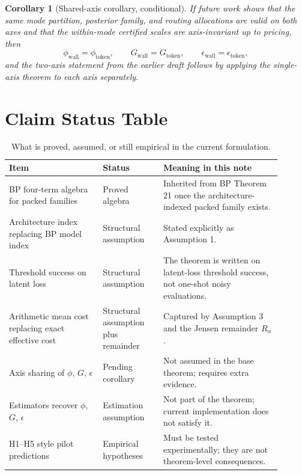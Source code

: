 \documentclass[11pt]{article}
\newtheorem{corollary}{Corollary}
\begin{document}
\begin{corollary}[Shared-axis corollary, conditional]
If future work shows that the same mode partition, posterior family, and routing allocations are
valid on both axes and that the within-mode certified scales are axis-invariant up to pricing, then
\[
\phi_{\mathrm{wall}}=\phi_{\mathrm{token}},\qquad
G_{\mathrm{wall}}=G_{\mathrm{token}},\qquad
\epsilon_{\mathrm{wall}}=\epsilon_{\mathrm{token}},
\]
and the two-axis statement from the earlier draft follows by applying the single-axis theorem to
each axis separately.
\end{corollary}

\section{Claim Status Table}

\begin{table}[h]
\centering
\begin{tabular}{p{0.31\linewidth} p{0.2\linewidth} p{0.39\linewidth}}
\toprule
Item & Status & Meaning in this note \\
\midrule
BP four-term algebra for packed families & Proved algebra & Inherited from BP Theorem 21 once the architecture-indexed packed family exists. \\
\addlinespace
Architecture index replacing BP model index & Structural assumption & Stated explicitly as Assumption 1. \\
\addlinespace
Threshold success on latent loss & Structural assumption & The theorem is written on latent-loss threshold success, not one-shot noisy evaluations. \\
\addlinespace
Arithmetic mean cost replacing exact effective cost & Structural assumption plus remainder & Captured by Assumption 3 and the Jensen remainder $R_\alpha$. \\
\addlinespace
Axis sharing of $\phi$, $G$, $\epsilon$ & Pending corollary & Not assumed in the base theorem; requires extra evidence. \\
\addlinespace
Estimators recover $\phi$, $G$, $\epsilon$ & Estimation assumption & Not part of the theorem; current implementation does not satisfy it. \\
\addlinespace
H1--H5 style pilot predictions & Empirical hypotheses & Must be tested experimentally; they are not theorem-level consequences. \\
\bottomrule
\end{tabular}
\caption{What is proved, assumed, or still empirical in the current formulation.}
\end{table}
\end{document}
